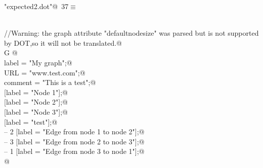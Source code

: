 \documentclass[a4paper]{report}
\begin{document}
\begin{flushleft} \small
\begin{minipage}{\linewidth}\label{scrap37}\raggedright\small
{} \verb@"expected2.dot"@\nobreak\ {\footnotesize {37}}$\equiv$
\vspace{-1ex}
\begin{list}{}{} \item
\mbox{}\verb@@\\
\mbox{}\verb@//Warning: the graph attribute "defaultnodesize" was parsed but is not supported by DOT,so it will not be translated.@\\
\mbox{}\verb@graph G {@\\
\mbox{}\verb@        label = "My graph";@\\
\mbox{}\verb@        URL = "www.test.com";@\\
\mbox{}\verb@        comment = "This is a test";@\\
\mbox{} [label = "Node 1"];@\\
\mbox{} [label = "Node 2"];@\\
\mbox{} [label = "Node 3"];@\\
\mbox{} [label = "test"];@\\
\mbox{} -- 2 [label = "Edge from node 1 to node 2"];@\\
\mbox{} -- 3 [label = "Edge from node 2 to node 3"];@\\
\mbox{} -- 1 [label = "Edge from node 3 to node 1"];@\\
\mbox{}\verb@}@\\
\mbox{}\verb@@{\NWsep}
\end{list}
\vspace{-1.5ex}
\footnotesize
\begin{list}{}{\setlength{\itemsep}{-\parsep}\setlength{\itemindent}{-\leftmargin}}

\item{}
\end{list}
\end{minipage}\vspace{4ex}
\end{flushleft}
\newpage
\end{document}
